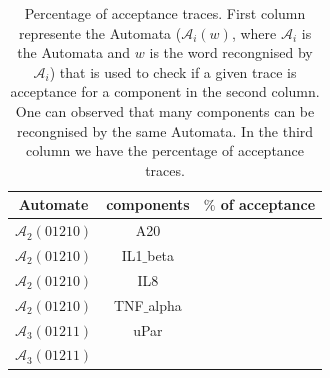 \begin{table}[!t]
\renewcommand{\arraystretch}{1.3}
\caption{Percentage of acceptance traces. First column represente the Automata ($\mathcal{A}_{i}(w)$, where $\mathcal{A}_{i}$ is the Automata and $w$ is the word recongnised by $\mathcal{A}_{i}$) 
that is used to check if a given trace is acceptance for a component in the second 
column. One can observed that many components can be recongnised by the same Automata. In the third column we have the percentage of acceptance traces.}
\label{traceAnalysis}
\centering
\begin{tabular}{|c|c||c|}
\hline

\textbf{Automate}

&

\textbf{components}

&

\textbf{$\%$ of acceptance}

\\ \hline

$\mathcal{A}_{2}(01210)$

&

A20

&


\\ \hline

$\mathcal{A}_{2}(01210)$

&

IL1$\_$beta

&


\\ \hline

$\mathcal{A}_{2}(01210)$

&

IL8

&


\\ \hline

$\mathcal{A}_{2}(01210)$

&

TNF$\_$alpha

&


\\ \hline

$\mathcal{A}_{3}(01211)$

&

uPar

&


\\ \hline

$\mathcal{A}_{3}(01211)$

&


\end{tabular}
\end{table}
